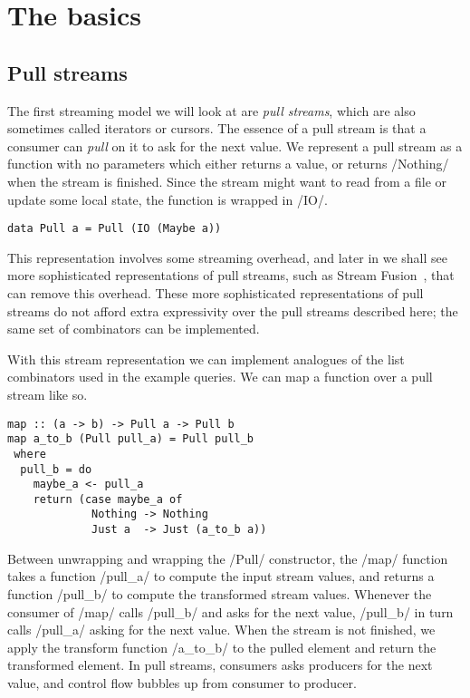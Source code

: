 \section{The basics}

\subsection{Pull streams}

The first streaming model we will look at are \emph{pull streams}, which are also sometimes called iterators or cursors.
The essence of a pull stream is that a consumer can \emph{pull} on it to ask for the next value.
We represent a pull stream as a function with no parameters which either returns a value, or returns \Hs/Nothing/ when the stream is finished.
Since the stream might want to read from a file or update some local state, the function is wrapped in \Hs/IO/.

\begin{lstlisting}
data Pull a = Pull (IO (Maybe a))
\end{lstlisting}

This representation involves some streaming overhead, and later in  we shall see more sophisticated representations of pull streams, such as Stream Fusion~\cite{coutts2007stream}, that can remove this overhead.
These more sophisticated representations of pull streams do not afford extra expressivity over the pull streams described here; the same set of combinators can be implemented.

With this stream representation we can implement analogues of the list combinators used in the example queries.
We can map a function over a pull stream like so.

\begin{lstlisting}
map :: (a -> b) -> Pull a -> Pull b
map a_to_b (Pull pull_a) = Pull pull_b
 where
  pull_b = do
    maybe_a <- pull_a
    return (case maybe_a of
             Nothing -> Nothing
             Just a  -> Just (a_to_b a))
\end{lstlisting}

Between unwrapping and wrapping the \Hs/Pull/ constructor, the \Hs/map/ function takes a function \Hs/pull_a/ to compute the input stream values, and returns a function \Hs/pull_b/ to compute the transformed stream values.
Whenever the consumer of \Hs/map/ calls \Hs/pull_b/ and asks for the next value, \Hs/pull_b/ in turn calls \Hs/pull_a/ asking for the next value.
When the stream is not finished, we apply the transform function \Hs/a_to_b/ to the pulled element and return the transformed element.
In pull streams, consumers asks producers for the next value, and control flow bubbles up from consumer to producer.

